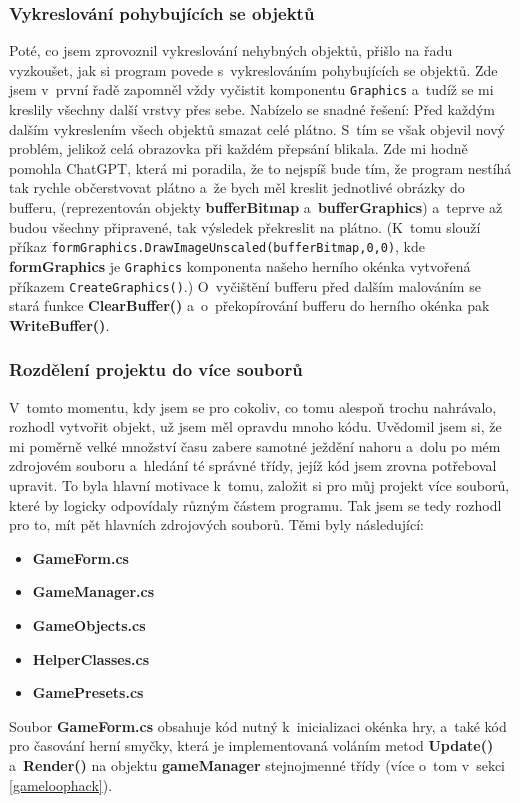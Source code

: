 \documentclass{article}
\begin{document}
\subsubsection{Vykreslování pohybujících se objektů} \label{buffering}
Poté, co jsem zprovoznil vykreslování nehybných objektů, přišlo na řadu vyzkoušet, jak si program povede s~vykreslováním pohybujících se objektů. Zde jsem v~první řadě zapomněl vždy vyčistit komponentu \verb|Graphics| a~tudíž se mi kreslily všechny další vrstvy přes sebe. Nabízelo se snadné řešení: Před každým dalším vykreslením všech objektů smazat celé plátno. S~tím se však objevil nový problém, jelikož celá obrazovka při každém přepsání blikala. Zde mi hodně pomohla ChatGPT, která mi poradila, že to nejspíš bude tím, že program nestíhá tak rychle občerstvovat plátno a~že bych měl kreslit jednotlivé obrázky do bufferu, (reprezentován objekty \textbf{bufferBitmap} a~\textbf{bufferGraphics}) a~teprve až budou všechny připravené, tak výsledek překreslit na plátno. (K~tomu slouží příkaz \verb|formGraphics.DrawImageUnscaled(bufferBitmap,0,0)|, kde \textbf{formGraphics} je \verb|Graphics| komponenta našeho herního okénka vytvořená příkazem \verb|CreateGraphics()|.) O~vyčištění bufferu před dalším malováním se stará funkce \textbf{ClearBuffer()} a~o~překopírování bufferu do herního okénka pak \textbf{WriteBuffer()}.

\subsubsection{Rozdělení projektu do více souborů}
V~tomto momentu, kdy jsem se pro cokoliv, co tomu alespoň trochu nahrávalo, rozhodl vytvořit objekt, už jsem měl opravdu mnoho kódu. Uvědomil jsem si, že mi poměrně velké množství času zabere samotné ježdění nahoru a~dolu po mém zdrojovém souboru a~hledání té správné třídy, jejíž kód jsem zrovna potřeboval upravit. To byla hlavní motivace k~tomu, založit si pro můj projekt více souborů, které by logicky odpovídaly různým částem programu. Tak jsem se tedy rozhodl pro to, mít pět hlavních zdrojových souborů. Těmi byly následující:
\begin{itemize}
    \item \textbf{GameForm.cs}
    \item \textbf{GameManager.cs}
    \item \textbf{GameObjects.cs}
    \item \textbf{HelperClasses.cs}
    \item \textbf{GamePresets.cs}
\end{itemize}
Soubor \textbf{GameForm.cs} obsahuje kód nutný k~inicializaci okénka hry, a~také kód pro časování herní smyčky, která je implementovaná voláním metod \textbf{Update()} a~\textbf{Render()} na objektu \textbf{gameManager} stejnojmenné třídy (více o~tom v~sekci \ref{gameloophack}). 
\end{document}

